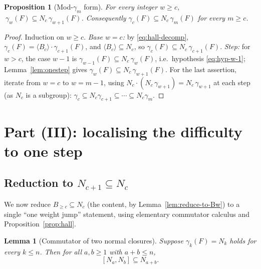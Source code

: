 \documentclass{amsart}
\newtheorem{lemma}{Lemma}
\newtheorem{proposition}{Proposition}
\theoremstyle{definition}
\theoremstyle{remark}
\begin{document}
\begin{proposition}[Mod-$\gamma_m$ form]\label{prop:moddescent}
For every integer $w\ge c$, $\ \gamma_w(F)\subseteq N_c\,\gamma_{w+1}(F)$.
Consequently $\gamma_c(F)\subseteq N_c\,\gamma_m(F)$ for every $m\ge c$.
\end{proposition}

\begin{proof}
Induction on $w\ge c$. \emph{Base $w=c$:} by \eqref{eq:hall-decomp},
$\gamma_c(F)=\langle B_c\rangle\cdot\gamma_{c+1}(F)$, and $\langle B_c\rangle
\subseteq N_c$, so $\gamma_c(F)\subseteq N_c\,\gamma_{c+1}(F)$. \emph{Step:} for
$w>c$, the case $w-1$ is $\gamma_{w-1}(F)\subseteq N_c\,\gamma_{w}(F)$, i.e.\
hypothesis \eqref{eq:hyp-w-1}; Lemma~\ref{lem:onestep} gives $\gamma_w(F)\subseteq
N_c\,\gamma_{w+1}(F)$. For the last assertion, iterate from $w=c$ to $w=m-1$, using
$N_c\cdot(N_c\,\gamma_{w+1})=N_c\,\gamma_{w+1}$ at each step (as $N_c$ is a
subgroup): $\gamma_c\subseteq N_c\gamma_{c+1}\subseteq\cdots\subseteq N_c\gamma_m$.
\end{proof}

\section{Part (III): localising the difficulty to one step}\label{sec:reduce}

\subsection{Reduction to $N_{c+1}\subseteq N_c$}

We now reduce $B_{\ge c}\subseteq N_c$ (the content, by
Lemma~\ref{lem:reduce-to-Bw}) to a single ``one weight jump'' statement, using
elementary commutator calculus and Proposition~\ref{prop:hall}.

\begin{lemma}[Commutator of two normal closures]\label{lem:K}
Suppose $\gamma_k(F)=N_k$ holds for every $k\le n$. Then for all $a,b\ge1$ with
$a+b\le n$,
\[
[N_a,N_b]\subseteq N_{a+b}.
\]
\end{lemma}
\end{document}
